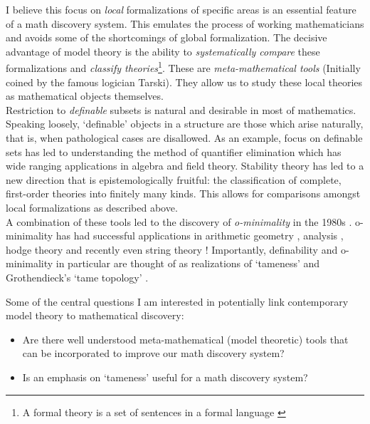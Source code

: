 I believe this focus on \textit{local} formalizations of specific areas is an essential feature of a math discovery system. This emulates the process of working mathematicians and avoids some of the shortcomings of global formalization. The decisive advantage of model theory is the ability to \textit{systematically compare} these formalizations and \textit{classify theories}\footnote[3]{A formal theory is a set of sentences in a formal language \cite{changModelTheory1990}}.
These are \textit{meta-mathematical tools} (Initially coined by the famous logician Tarski). They allow us to study these local theories as mathematical objects themselves. \\
Restriction to \textit{definable} subsets is natural and desirable in most of mathematics. Speaking loosely, `definable' objects in a structure are those which arise naturally, that is, when pathological cases are disallowed. As an example, focus on definable sets has led to understanding the method of quantifier elimination \cite{robinsonApplicationSymbolicLogic1952,TarskiDecisionMethod} which has wide ranging applications in algebra and field theory.
Stability theory has led to a  new direction that is epistemologically fruitful: the classification of complete, first-order theories into finitely many kinds. This allows for comparisons amongst local formalizations as described above.\\
A combination of these tools led to the discovery of \textit{o-minimality} in the 1980s \cite{pillayDefinableSetsOrdered1986, DENDRIES198497}. o-minimality has had successful applications in arithmetic geometry \cite{binyaminiWilkiesConjecturePfaffian2022,binyaminiBoundsRationalPoints2023}, analysis \cite{pilaOminimalityAndreOortConjecture2011}, hodge theory and recently even string theory \cite{douglasTamenessQuantumField2022,grimmComplexityTameQuantum2023,grimmFinitenessTheoremsCounting2023,grimmTamenessStringsDistance2022}!
Importantly, definability and o-minimality in particular are thought of as realizations of `tameness' and Grothendieck's `tame topology' \cite{acampoGrothendieckTameTopology2016, piekoszTameTopology2023}.
\par
Some of the central questions I am interested in potentially link contemporary model theory to mathematical discovery:
\begin{itemize}
    \item Are there well understood meta-mathematical (model theoretic) tools that can be incorporated to improve our math discovery system?
    \item Is an emphasis on `tameness' useful for a math discovery system?
\end{itemize}


